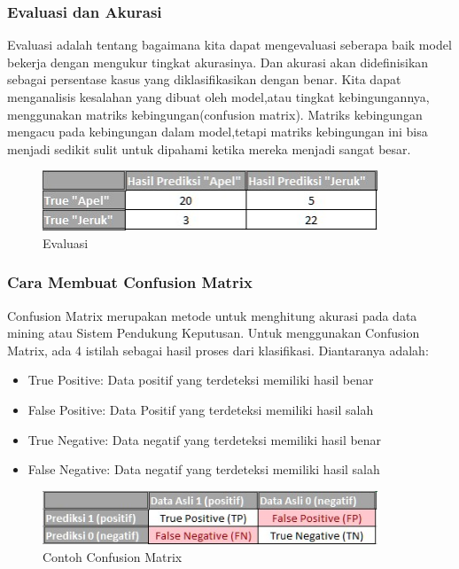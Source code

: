 \subsubsection{Evaluasi dan Akurasi}

Evaluasi adalah tentang bagaimana kita dapat mengevaluasi seberapa baik model bekerja dengan mengukur tingkat akurasinya. Dan akurasi akan didefinisikan sebagai persentase kasus yang diklasifikasikan dengan benar. Kita dapat menganalisis kesalahan yang dibuat oleh model,atau tingkat kebingungannya, menggunakan matriks kebingungan(confusion matrix). Matriks kebingungan mengacu pada kebingungan dalam model,tetapi matriks kebingungan ini bisa menjadi sedikit sulit untuk dipahami ketika mereka menjadi sangat besar.
\begin{figure}[H]
\centerline{\includegraphics[width=10cm]{figures/1174080/2/5.jpg}}
\caption{Evaluasi}
\label{labelgambar}
\end{figure}

\subsubsection{Cara Membuat Confusion Matrix}

Confusion Matrix merupakan metode untuk menghitung akurasi pada data mining atau Sistem Pendukung Keputusan. Untuk menggunakan Confusion Matrix, ada 4 istilah sebagai hasil proses dari klasifikasi. Diantaranya adalah:
\begin{itemize}
\item True Positive: Data positif yang terdeteksi memiliki hasil benar
\item False Positive: Data Positif yang terdeteksi memiliki hasil salah
\item True Negative: Data negatif yang terdeteksi memiliki hasil benar
\item False Negative: Data negatif yang terdeteksi memiliki hasil salah
\end{itemize}
\begin{figure}[H]
\centerline{\includegraphics[width=10cm]{figures/1174080/2/6.jpg}}
\caption{Contoh Confusion Matrix}
\label{labelgambar}
\end{figure}

